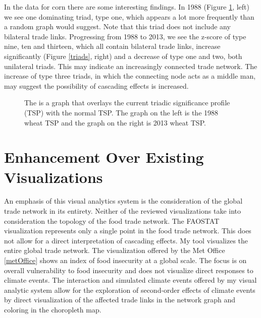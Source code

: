 		In the data for corn there are some interesting findings. In 1988 (Figure \ref{tsps}, left) we see one dominating triad, type one, which appears a lot more frequently than a random graph would suggest. Note that this triad does not include any bilateral trade links. Progressing from 1988 to 2013, we see the z-score of type nine, ten and thirteen, which all contain bilateral trade links, increase significantly (Figure \ref{triads}, right) and a decrease of type one and two, both unilateral triads. This may indicate an increasingly connected trade network. The increase of type three triads, in which the connecting node acts as a middle man, may suggest the possibility of cascading effects is increased.\par
		\begin{figure}[htb]
			\caption[TRIAD SIGNIFICANCE PROFILES]{The is a graph that overlays the current triadic significance profile (TSP) with the normal TSP. The graph on the left is the 1988 wheat TSP and the graph on the right is 2013 wheat TSP. }
			\label{tsps}
		\end{figure}
\section{Enhancement Over Existing Visualizations}
	An emphasis of this visual analytics system is the consideration of the global trade network in its entirety. Neither of the reviewed visualizations take into consideration the topology of the food trade network. The FAOSTAT visualization represents only a single point in the food trade network. This does not allow for a direct interpretation of cascading effects. My tool visualizes the entire global trade network. The visualization offered by the Met Office \ref{metOffice} shows an index of food insecurity at a global scale. The focus is on overall vulnerability to food insecurity and does not visualize direct responses to climate events. The interaction and simulated climate events offered by my visual analytic system allow for the exploration of second-order effects of climate events by direct visualization of the affected trade links in the network graph and coloring in the choropleth map.\par
		